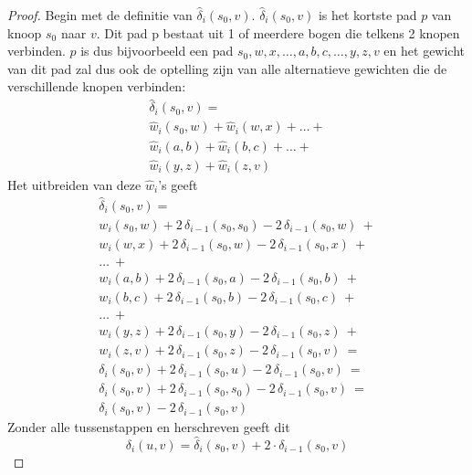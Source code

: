 \documentclass[conference]{IEEEtran}
\theoremstyle{definition}
\begin{document}
\begin{proof}
    Begin met de definitie van $\hat{\delta}_i(s_0, v)$. $\hat{\delta}_i(s_0, v)$ is het kortste pad $p$ van knoop $s_0$ naar $v$. Dit pad p bestaat uit 1 of meerdere bogen die telkens 2 knopen verbinden. $p$ is dus bijvoorbeeld een pad $s_0, w, x, \dots, a, b, c, \dots, y, z, v$ en het gewicht van dit pad zal dus ook de optelling zijn van alle alternatieve gewichten die de verschillende knopen verbinden:
    \begin{gather*}
        \hat{\delta}_i(s_0, v) = \\
        \hat{w}_i(s_0, w) + \hat{w}_i(w, x) + \dots + \\
        \hat{w}_i(a, b) + \hat{w}_i(b, c) + \dots + \\
        \hat{w}_i(y, z) + \hat{w}_i(z, v)
    \end{gather*}
    Het uitbreiden van deze $\hat{w}_i$'s geeft
    \begin{gather*}
        \hat{\delta}_i(s_0, v) = \\
        w_i(s_0, w) + 2\, \delta_{i-1}(s_0, s_0) - 2\, \delta_{i-1}(s_0, w)\ + \\
        w_i(w, x) + 2\, \delta_{i-1}(s_0, w) - 2\, \delta_{i-1}(s_0, x)\ + \\
        \dots\ + \\
        w_i(a, b) + 2\, \delta_{i-1}(s_0, a) - 2\, \delta_{i-1}(s_0, b)\ + \\
        w_i(b, c) + 2\, \delta_{i-1}(s_0, b) - 2\, \delta_{i-1}(s_0, c)\ + \\
        \dots\ + \\
        w_i(y, z) + 2\, \delta_{i-1}(s_0, y) - 2\, \delta_{i-1}(s_0, z)\ + \\
        w_i(z, v) + 2\, \delta_{i-1}(s_0, z) - 2\, \delta_{i-1}(s_0, v)\ = \\
        \delta_i(s_0, v) + 2\, \delta_{i-1}(s_0, u) - 2\, \delta_{i-1}(s_0, v)\ = \\
        \delta_i(s_0, v) + 2\, \delta_{i-1}(s_0, s_0) - 2\, \delta_{i-1}(s_0, v)\ = \\
        \delta_i(s_0, v) - 2\, \delta_{i-1}(s_0, v)
    \end{gather*}
    Zonder alle tussenstappen en herschreven geeft dit
    \begin{displaymath}
        \delta_i(u, v) = \hat{\delta}_i(s_0, v) + 2 \cdot \delta_{i-1}(s_0, v)
    \end{displaymath}
\end{proof}
\end{document}
